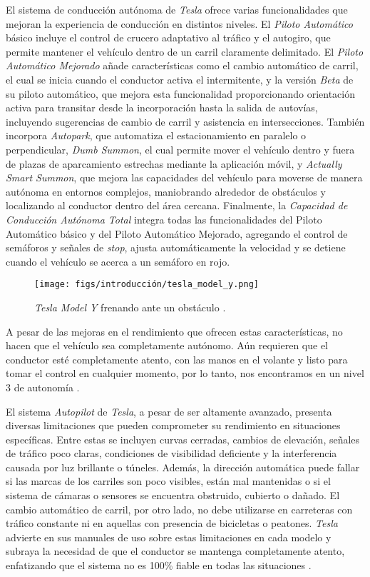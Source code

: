 El sistema de conducción autónoma de \textit{Tesla} ofrece varias funcionalidades que mejoran la experiencia de conducción en distintos niveles. El \textit{Piloto Automático} básico incluye el control de crucero adaptativo al tráfico y el autogiro, que permite mantener el vehículo dentro de un carril claramente delimitado. El \textit{Piloto Automático Mejorado} añade características como el cambio automático de carril, el cual se inicia cuando el conductor activa el intermitente, y la versión \textit{Beta} de su piloto automático, que mejora esta funcionalidad proporcionando orientación activa para transitar desde la incorporación hasta la salida de autovías, incluyendo sugerencias de cambio de carril y asistencia en intersecciones. También incorpora \textit{Autopark}, que automatiza el estacionamiento en paralelo o perpendicular, \textit{Dumb Summon}, el cual permite mover el vehículo dentro y fuera de plazas de aparcamiento estrechas mediante la aplicación móvil, y \textit{Actually Smart Summon}, que mejora las capacidades del vehículo para moverse de manera autónoma en entornos complejos, maniobrando alrededor de obstáculos y localizando al conductor dentro del área cercana. Finalmente, la \textit{Capacidad de Conducción Autónoma Total} integra todas las funcionalidades del Piloto Automático básico y del Piloto Automático Mejorado, agregando el control de semáforos y señales de \textit{stop}, ajusta automáticamente la velocidad y se detiene cuando el vehículo se acerca a un semáforo en rojo.

\begin{figure}[ht]
\begin{center}
\texttt{[image: figs/introducción/tesla\_model\_y.png]}
\end{center}
\caption{\textit{Tesla Model Y} frenando ante un obstáculo \cite{tesla-modely}.}
\label{tesla}
\end{figure}

A pesar de las mejoras en el rendimiento que ofrecen estas características, no hacen que el vehículo sea completamente autónomo. Aún requieren que el conductor esté completamente atento, con las manos en el volante y listo para tomar el control en cualquier momento, por lo tanto, nos encontramos en un nivel 3 de autonomía \cite{tesla-autopilot}.

El sistema \textit{Autopilot} de \textit{Tesla}, a pesar de ser altamente avanzado, presenta diversas limitaciones que pueden comprometer su rendimiento en situaciones específicas. Entre estas se incluyen curvas cerradas, cambios de elevación, señales de tráfico poco claras, condiciones de visibilidad deficiente y la interferencia causada por luz brillante o túneles. Además, la dirección automática puede fallar si las marcas de los carriles son poco visibles, están mal mantenidas o si el sistema de cámaras o sensores se encuentra obstruido, cubierto o dañado. El cambio automático de carril, por otro lado, no debe utilizarse en carreteras con tráfico constante ni en aquellas con presencia de bicicletas o peatones. \textit{Tesla} advierte en sus manuales de uso sobre estas limitaciones en cada modelo y subraya la necesidad de que el conductor se mantenga completamente atento, enfatizando que el sistema no es 100\% fiable en todas las situaciones \cite{tesla-limitations}.

